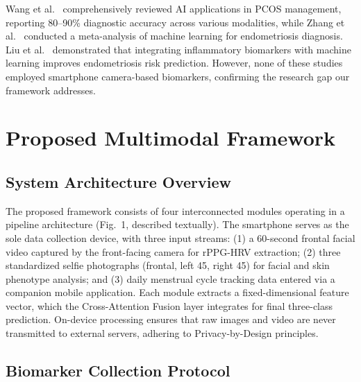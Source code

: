 \documentclass[conference]{IEEEtran}
\begin{document}
Wang et al.~\cite{Wang_2025} comprehensively reviewed AI applications in PCOS management, reporting 80--90\% diagnostic accuracy across various modalities, while Zhang et al.~\cite{Zhang_2026} conducted a meta-analysis of machine learning for endometriosis diagnosis. Liu et al.~\cite{Liu_2025} demonstrated that integrating inflammatory biomarkers with machine learning improves endometriosis risk prediction. However, none of these studies employed smartphone camera-based biomarkers, confirming the research gap our framework addresses.

\section{Proposed Multimodal Framework}

\subsection{System Architecture Overview}

The proposed framework consists of four interconnected modules operating in a pipeline architecture (Fig.~1, described textually). The smartphone serves as the sole data collection device, with three input streams: (1) a 60-second frontal facial video captured by the front-facing camera for rPPG-HRV extraction; (2) three standardized selfie photographs (frontal, left 45\textdegree, right 45\textdegree) for facial and skin phenotype analysis; and (3) daily menstrual cycle tracking data entered via a companion mobile application. Each module extracts a fixed-dimensional feature vector, which the Cross-Attention Fusion layer integrates for final three-class prediction. On-device processing ensures that raw images and video are never transmitted to external servers, adhering to Privacy-by-Design principles.

\subsection{Biomarker Collection Protocol}
\end{document}
